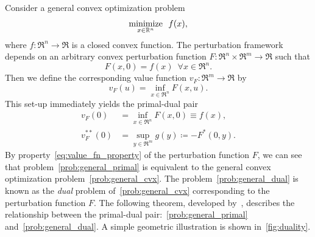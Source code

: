 Consider a general convex optimization problem
\begin{equation} \label{prob:general_cvx}
    \displaystyle\mathop{\hbox{\rm minimize}}_{x \in \mathbb{R}^n}\enspace f(x),
\end{equation}
where $f:\Re^n \to \Re$ is a closed convex function. The perturbation framework depends on an arbitrary convex perturbation function $F: \Re^n \times \Re^m \to \Re$ such that 
\begin{equation} \label{eq:value_fn_property}
    F(x, 0) = f(x) \enspace \forall x \in \Re^n.
\end{equation}
Then we define the corresponding value function $v_F : \Re^m \to \Re$ by
\begin{equation}
    v_F(u) = \inf_{x \in \Re^n} F(x, u).
\end{equation}
This set-up immediately yields the primal-dual pair
\begin{align}
    v_F(0) &= \inf_{x \in \Re^n} F(x, 0) \equiv f(x), \label{prob:general_primal}\\
    v_F^{**}(0) &= \sup_{y \in \Re^m} g(y) \coloneqq -F^*(0, y). \label{prob:general_dual}
\end{align}
By property~\eqref{eq:value_fn_property} of the perturbation function $F$, we can see that problem~\eqref{prob:general_primal} is equivalent to the general convex optimization problem~\eqref{prob:general_cvx}. The problem~\eqref{prob:general_dual} is known as the \emph{dual} problem of~\eqref{prob:general_cvx} corresponding to the perturbation function $F$. 
The following theorem, developed by~\citet{rockafellar1998variational}, describes the relationship between the primal-dual pair:~\eqref{prob:general_primal} and~\eqref{prob:general_dual}. A simple geometric illustration is shown in~\autoref{fig:duality}.

